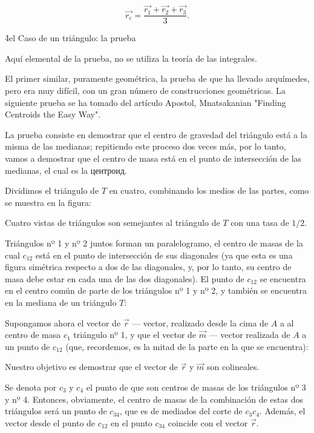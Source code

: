 $$ \vec{r_c} = \frac{ \vec{r_1} + \vec{r_2} + \vec{r_3} }{ 3 }. $$

\h4{el Caso de un triángulo: la prueba}

Aquí elemental de la prueba, no se utiliza la teoría de las integrales. 

El primer similar, puramente geométrica, la prueba de que ha llevado arquímedes, pero era muy difícil, con un gran número de construcciones geométricas. La siguiente prueba se ha tomado del artículo Apostol, Mnatsakanian "Finding Centroids the Easy Way".

La prueba consiste en demostrar que el centro de gravedad del triángulo está a la misma de las medianas; repitiendo este proceso dos veces más, por lo tanto, vamos a demostrar que el centro de masa está en el punto de intersección de las medianas, el cual es la центроид.

Dividimos el triángulo de $T$ en cuatro, combinando los medios de las partes, como se muestra en la figura:


Cuatro vistas de triángulos son semejantes al triángulo de $T$ con una tasa de $1/2$.

Triángulos nº 1 y nº 2 juntos forman un paralelogramo, el centro de masas de la cual $c_{12}$ está en el punto de intersección de sus diagonales (ya que esta es una figura simétrica respecto a dos de las diagonales, y, por lo tanto, su centro de masa debe estar en cada una de las dos diagonales). El punto de $c_{12}$ se encuentra en el centro común de parte de los triángulos nº 1 y nº 2, y también se encuentra en la mediana de un triángulo $T$:


Supongamos ahora el vector de $\vec{r}$ --- vector, realizado desde la cima de $A$ a al centro de masa $c_1$ triángulo nº 1, y que el vector de $\vec{m}$ --- vector realizada de $A$ a un punto de $c_{12}$ (que, recordemos, es la mitad de la parte en la que se encuentra):


Nuestro objetivo es demostrar que el vector de $\vec{r}$ y $\vec{m}$ son colineales.

Se denota por $c_3$ y $c_4$ el punto de que son centros de masas de los triángulos nº 3 y nº 4. Entonces, obviamente, el centro de masas de la combinación de estas dos triángulos será un punto de $c_{34}$, que es de mediados del corte de $c_3 c_4$. Además, el vector desde el punto de $c_{12}$ en el punto $c_{34}$ coincide con el vector $\vec{r}$.


